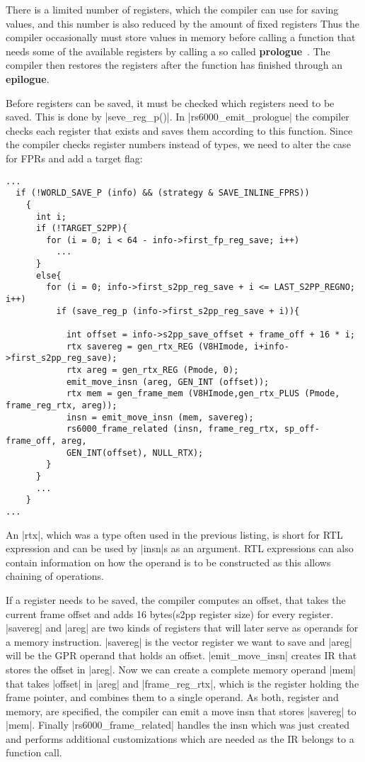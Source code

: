 There is a limited number of registers, which the compiler can use for saving values, and this number is also reduced by the amount of fixed registers
Thus the compiler occasionally must store values in memory before calling a function that needs some of the available registers by calling a so called \textbf{prologue}~\citep[ch.~17.9.11]{GCCint}.
The compiler then restores the registers after the function has finished through an \textbf{epilogue}.

Before registers can be saved, it must be checked which registers need to be saved.
This is done by |seve_reg_p()|.
In |rs6000_emit_prologue| the compiler checks each register that exists and saves them according to this function.
Since the compiler checks register numbers instead of types, we need to alter the case for FPRs and add a target flag:
\begin{lstlisting}
...
  if (!WORLD_SAVE_P (info) && (strategy & SAVE_INLINE_FPRS))
    {
      int i;
      if (!TARGET_S2PP){
        for (i = 0; i < 64 - info->first_fp_reg_save; i++)
          ...
      }
      else{
        for (i = 0; info->first_s2pp_reg_save + i <= LAST_S2PP_REGNO; i++)
          if (save_reg_p (info->first_s2pp_reg_save + i)){

            int offset = info->s2pp_save_offset + frame_off + 16 * i;
            rtx savereg = gen_rtx_REG (V8HImode, i+info->first_s2pp_reg_save);
            rtx areg = gen_rtx_REG (Pmode, 0);
            emit_move_insn (areg, GEN_INT (offset));
            rtx mem = gen_frame_mem (V8HImode,gen_rtx_PLUS (Pmode, frame_reg_rtx, areg));
            insn = emit_move_insn (mem, savereg);
            rs6000_frame_related (insn, frame_reg_rtx, sp_off-frame_off, areg,
            GEN_INT(offset), NULL_RTX);
        }
      }
      ...
    }
...
\end{lstlisting}
An |rtx|, which was a type often used in the previous listing, is short for \ac{RTL} expression and can be used by |insn|s as an argument.
\ac{RTL} expressions can also contain information on how the operand is to be constructed as this allows chaining of operations.

If a register needs to be saved, the compiler computes an offset, that takes the current frame offset and adds 16 bytes(s2pp register size) for every register.
|savereg| and |areg| are two kinds of registers that will later serve as operands for a memory instruction.
|savereg| is the vector register we want to save and |areg| will be the GPR operand that holds an offset.
|emit_move_insn| creates IR that stores the offset in |areg|.
Now we can create a complete memory operand |mem| that takes |offset| in |areg| and |frame_reg_rtx|, which is the register holding the frame pointer, and combines them to a single operand.
As both, register and memory, are specified, the compiler can emit a move insn that stores |savereg| to |mem|.
Finally |rs6000_frame_related| handles the insn which was just created and performs additional customizations which are needed as the IR belongs to a function call.

